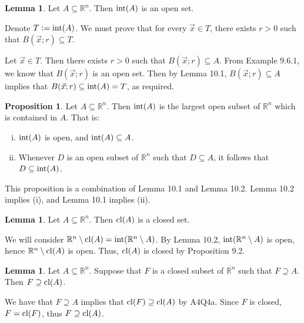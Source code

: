\documentclass[11pt]{article}
\makeatletter
\theoremstyle{definition}
\newtheorem{prop}[thm]{Proposition}
\newtheorem{lemma}[thm]{Lemma}
\newcommand{\R}{\ensuremath{\mathbb{R}}}
\newenvironment{pf}[1][\proofname]{\par
  \pushQED{\qed}%
  \normalfont \topsep0\p@\relax
  \trivlist
  \item[\hskip\labelsep\itshape
  #1\@addpunct{.}]\ignorespaces
}{%
  \popQED\endtrivlist\@endpefalse
}
\makeatother
\begin{document}
\begin{lemma}
Let $A \subseteq \R^n$. Then ${\rm int}(A)$ is an open set.
\end{lemma}
\begin{pf}
Denote $T := {\rm int}(A)$. We must prove that for every $\vec{x} \in T$, there exists $r > 0$ such that $B(\vec{x}; r) \subseteq T$. 

Let $\vec{x} \in T$. Then there exists $r > 0$ such that $B(\vec{x}; r) \subseteq A$. From Example 9.6.1, we know that $B(\vec{x}; r)$ is an open set. Then by Lemma 10.1, $B(\vec{x}; r) \subseteq A$ implies that $B(\vec{x}; r) \subseteq {\rm int}(A) = T$, as required.
\end{pf}

\begin{prop}
Let $A \subseteq \R^n$. Then ${\rm int}(A)$ is the largest open subset of $\R^n$ which is contained in $A$. That is:\vspace{-1.5ex}
\begin{enumerate}[(i)]
\item ${\rm int}(A)$ is open, and ${\rm int}(A) \subseteq A$.
\item Whenever $D$ is an open subset of $\R^n$ such that $D \subseteq A$, it follows that $D \subseteq {\rm int}(A)$.
\end{enumerate}
\end{prop}
\begin{pf}
This proposition is a combination of Lemma 10.1 and Lemma 10.2. Lemma 10.2 implies (i), and Lemma 10.1 implies (ii).
\end{pf}

\begin{lemma}
Let $A \subseteq \R^n$. Then ${\rm cl}(A)$ is a closed set.
\end{lemma}
\begin{pf}
We will consider $\R^n \setminus {\rm cl}(A) = {\rm int}(\R^n \setminus A)$. By Lemma 10.2, ${\rm int}(\R^n \setminus A)$ is open, hence $\R^n \setminus {\rm cl}(A)$ is open. Thus, ${\rm cl}(A)$ is closed by Proposition 9.2.
\end{pf}

\begin{lemma}
Let $A \subseteq \R^n$. Suppose that $F$ is a closed subset of $\R^n$ such that $F \supseteq A$. Then $F \supseteq {\rm cl}(A)$.
\end{lemma}
\begin{pf}
We have that $F \supseteq A$ implies that ${\rm cl}(F) \supseteq {\rm cl}(A)$ by A4Q4a. Since $F$ is closed, $F = {\rm cl}(F)$, thus $F \supseteq {\rm cl}(A)$.
\end{pf}
\end{document}
